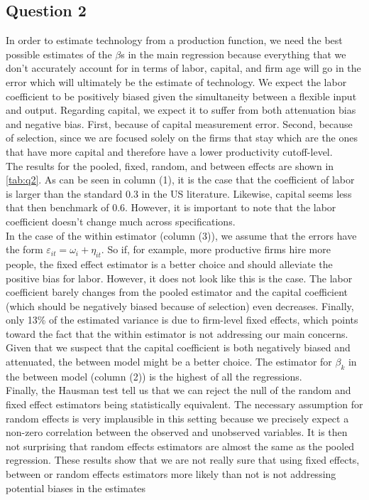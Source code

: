 \documentclass[11pt]{article}
\begin{document}
\subsection*{Question 2}
In order to estimate technology from a production function, we need the best possible estimates of the $\beta$s in the main regression because everything that we don't accurately account for in terms of labor, capital, and firm age will go in the error which will ultimately be the estimate of technology. We expect the labor coefficient to be positively biased given the simultaneity between a flexible input and output. Regarding capital, we expect it to suffer from both attenuation bias and negative bias. First, because of capital measurement error. Second, because of selection, since we are focused solely on the firms that stay which are the ones that have more capital and therefore have a lower productivity cutoff-level.\\

The results for the pooled, fixed, random, and between effects are shown in \autoref{tab:q2}. As can be seen in column (1), it is the case that the coefficient of labor is larger than the standard 0.3 in the US literature. Likewise, capital seems less that then benchmark of 0.6. However, it is important to note that the labor coefficient doesn't change much across specifications. \\

In the case of the within estimator (column (3)), we assume that the errors have the form $\varepsilon_{it}=\omega_i+\eta_{it}$. So if, for example, more productive firms hire more people, the fixed effect estimator is a better choice and should alleviate the positive bias for labor. However, it does not look like this is the case. The labor coefficient barely changes from the pooled estimator and the capital coefficient (which should be negatively biased because of selection) even decreases. Finally, only 13\% of the estimated variance is due to firm-level fixed effects, which points toward the fact that the within estimator is not addressing our main concerns. \\

Given that we suspect that the capital coefficient is both negatively biased and attenuated, the between model might be a better choice. The estimator for $\beta_k$ in the between model (column (2)) is the highest of all the regressions. \\

Finally, the Hausman test tell us that we can reject the null of the random and fixed effect estimators being statistically equivalent. The necessary assumption for random effects is very implausible in this setting because we precisely expect a non-zero correlation between the observed and unobserved variables. It is then not surprising that random effects estimators are almost the same as the pooled regression.  These results show that we are not really sure that using fixed effects, between or random effects estimators more likely than not is not addressing potential biases in the estimates
\end{document}
